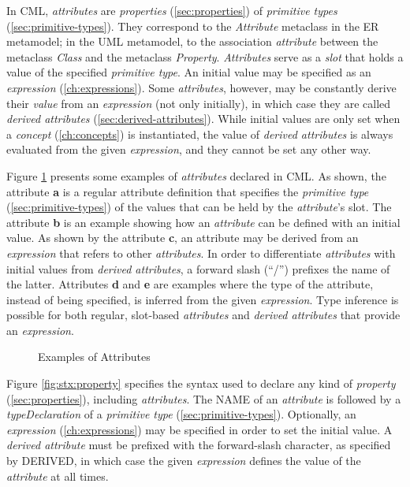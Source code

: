 \begin{definition}
In CML, \emph{attributes} are \emph{properties} (\ref{sec:properties})
of \emph{primitive types} (\ref{sec:primitive-types}).
They correspond to the \emph{Attribute} metaclass 
in the ER \cite{er} metamodel;
in the UML \cite{uml} metamodel,
to the association \emph{attribute} between the metaclass \emph{Class} 
and the metaclass \emph{Property}.
\emph{Attributes} serve as a \emph{slot} that holds a value of 
the specified \emph{primitive type}.
An initial value may be specified as an \emph{expression} (\ref{ch:expressions}).
Some \emph{attributes}, however, may be constantly
derive their \emph{value} from an \emph{expression} (not only initially),
in which case they are called \emph{derived attributes} (\ref{sec:derived-attributes}).
While initial values are only set when a \emph{concept} (\ref{ch:concepts})
is instantiated,
the value of \emph{derived attributes} is always evaluated 
from the given \emph{expression},
and they cannot be set any other way.
\end{definition}

\begin{examples}
Figure \ref{fig:ex:attributes} presents some examples of \emph{attributes} declared in CML.
As shown,
the attribute \textbf{a} is a regular attribute definition 
that specifies the \emph{primitive type} (\ref{sec:primitive-types})
of the values that can be held by the \emph{attribute}'s slot.
The attribute \textbf{b} is an example showing how an \emph{attribute}
can be defined with an initial value.
As shown by the attribute \textbf{c}, 
an attribute may be derived from an \emph{expression}
that refers to other \emph{attributes}.
In order to differentiate \emph{attributes} with initial values
from \emph{derived attributes},
a forward slash (``/'') prefixes the name of the latter.
Attributes \textbf{d} and \textbf{e} are examples
where the type of the attribute,
instead of being specified,
is inferred from the given \emph{expression}.
Type inference is possible for both regular, slot-based \emph{attributes}
and \emph{derived attributes} that provide an \emph{expression}.
\end{examples}

\begin{figure}
\verbatimfont{\small}

\caption{Examples of Attributes}
\label{fig:ex:attributes}
\end{figure}

\begin{concrete-syntax}
Figure \ref{fig:stx:property} specifies the syntax used
to declare any kind of \emph{property} (\ref{sec:properties}),
including \emph{attributes}.
The NAME of an \emph{attribute} is followed
by a \emph{typeDeclaration} of a \emph{primitive type}
(\ref{sec:primitive-types}).
Optionally, an \emph{expression} (\ref{ch:expressions}) may be specified
in order to set the initial value.
A \emph{derived attribute} must be prefixed with the forward-slash character,
as specified by DERIVED,
in which case the given \emph{expression} defines the value
of the \emph{attribute} at all times.
\end{concrete-syntax}

